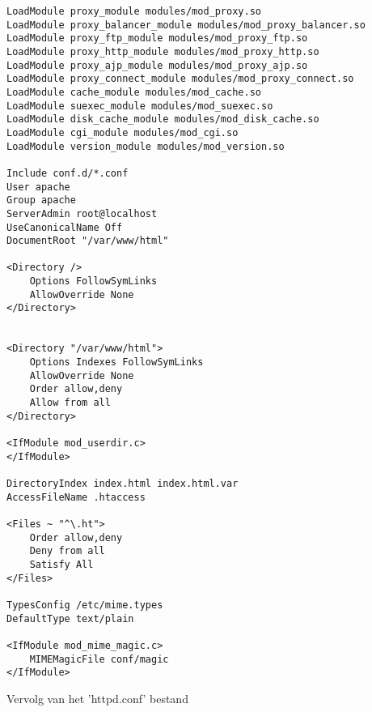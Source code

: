 \begin{code}
\begin{lstlisting}
LoadModule proxy_module modules/mod_proxy.so
LoadModule proxy_balancer_module modules/mod_proxy_balancer.so
LoadModule proxy_ftp_module modules/mod_proxy_ftp.so
LoadModule proxy_http_module modules/mod_proxy_http.so
LoadModule proxy_ajp_module modules/mod_proxy_ajp.so
LoadModule proxy_connect_module modules/mod_proxy_connect.so
LoadModule cache_module modules/mod_cache.so
LoadModule suexec_module modules/mod_suexec.so
LoadModule disk_cache_module modules/mod_disk_cache.so
LoadModule cgi_module modules/mod_cgi.so
LoadModule version_module modules/mod_version.so

Include conf.d/*.conf
User apache
Group apache
ServerAdmin root@localhost
UseCanonicalName Off
DocumentRoot "/var/www/html"

<Directory />
    Options FollowSymLinks
    AllowOverride None
</Directory>


<Directory "/var/www/html">
    Options Indexes FollowSymLinks
    AllowOverride None
    Order allow,deny
    Allow from all
</Directory>

<IfModule mod_userdir.c>
</IfModule>

DirectoryIndex index.html index.html.var
AccessFileName .htaccess

<Files ~ "^\.ht">
    Order allow,deny
    Deny from all
    Satisfy All
</Files>

TypesConfig /etc/mime.types
DefaultType text/plain

<IfModule mod_mime_magic.c>
    MIMEMagicFile conf/magic
</IfModule>
\end{lstlisting}
\end{code}
Vervolg van het 'httpd.conf' bestand
